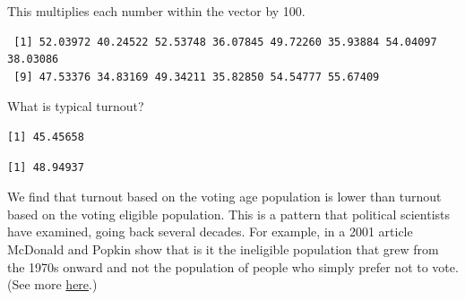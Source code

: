\documentclass[
  letterpaper,
  DIV=11,
  numbers=noendperiod]{scrreprt}
\newenvironment{Shaded}{\begin{snugshade}}{\end{snugshade}}
\newcommand{\FunctionTok}[1]{\textcolor[rgb]{0.28,0.35,0.67}{#1}}
\newcommand{\NormalTok}[1]{\textcolor[rgb]{0.00,0.23,0.31}{#1}}
\newcommand{\SpecialCharTok}[1]{\textcolor[rgb]{0.37,0.37,0.37}{#1}}
\begin{document}
This multiplies each number within the vector by 100.

\begin{Shaded}
\end{Shaded}

\begin{verbatim}
 [1] 52.03972 40.24522 52.53748 36.07845 49.72260 35.93884 54.04097 38.03086
 [9] 47.53376 34.83169 49.34211 35.82850 54.54777 55.67409
\end{verbatim}

What is typical turnout?

\begin{Shaded}
\end{Shaded}

\begin{verbatim}
[1] 45.45658
\end{verbatim}

\begin{Shaded}
\end{Shaded}

\begin{verbatim}
[1] 48.94937
\end{verbatim}

We find that turnout based on the voting age population is lower than
turnout based on the voting eligible population. This is a pattern that
political scientists have examined, going back several decades. For
example, in a 2001 article McDonald and Popkin show that is it the
ineligible population that grew from the 1970s onward and not the
population of people who simply prefer not to vote. (See more
\href{https://www.jstor.org/stable/3117725}{here}.)
\end{document}
